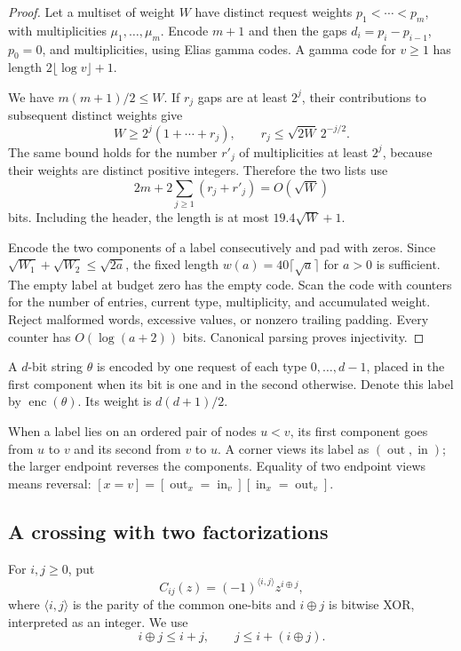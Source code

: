 \documentclass[11pt]{article}
\theoremstyle{definition}
\theoremstyle{remark}
\newcommand{\out}{\operatorname{out}}
\newcommand{\inn}{\operatorname{in}}
\newcommand{\enc}{\operatorname{enc}}
\newcommand{\ip}[2]{\langle #1,#2\rangle}
\begin{document}
\begin{proof}
Let a multiset of weight $W$ have distinct request weights $p_1<\cdots<p_m$, with multiplicities $\mu_1,\ldots,\mu_m$. Encode $m+1$ and then the gaps $d_i=p_i-p_{i-1}$, $p_0=0$, and multiplicities, using Elias gamma codes. A gamma code for $v\ge1$ has length $2\lfloor\log v\rfloor+1$.

We have $m(m+1)/2\le W$. If $r_j$ gaps are at least $2^j$, their contributions to subsequent distinct weights give
\[
 W\ge 2^j(1+\cdots+r_j),\qquad
 r_j\le\sqrt{2W}\,2^{-j/2}.
\]
The same bound holds for the number $r'_j$ of multiplicities at least $2^j$, because their weights are distinct positive integers. Therefore the two lists use
\[
 2m+2\sum_{j\ge1}(r_j+r'_j)=O(\sqrt W)
\]
bits. Including the header, the length is at most $19.4\sqrt W+1$.

Encode the two components of a label consecutively and pad with zeros. Since $\sqrt{W_1}+\sqrt{W_2}\le\sqrt{2a}$, the fixed length $w(a)=40\lceil\sqrt a\rceil$ for $a>0$ is sufficient. The empty label at budget zero has the empty code. Scan the code with counters for the number of entries, current type, multiplicity, and accumulated weight. Reject malformed words, excessive values, or nonzero trailing padding. Every counter has $O(\log(a+2))$ bits. Canonical parsing proves injectivity.
\end{proof}

A $d$-bit string $\theta$ is encoded by one request of each type $0,\ldots,d-1$, placed in the first component when its bit is one and in the second otherwise. Denote this label by $\enc(\theta)$. Its weight is $d(d+1)/2$.

When a label lies on an ordered pair of nodes $u<v$, its first component goes from $u$ to $v$ and its second from $v$ to $u$. A corner views its label as $(\out,\inn)$; the larger endpoint reverses the components. Equality of two endpoint views means reversal: $[x=v]=[\out_x=\inn_v][\inn_x=\out_v]$.

\subsection{A crossing with two factorizations}\label{sec:crossing}

For $i,j\ge0$, put
\[
 C_{ij}(z)=(-1)^{\ip ij}z^{i\oplus j},
\]
where $\ip ij$ is the parity of the common one-bits and $i\oplus j$ is bitwise XOR, interpreted as an integer. We use
\begin{equation}\label{eq:metric}
 i\oplus j\le i+j,\qquad j\le i+(i\oplus j).
\end{equation}
\end{document}
